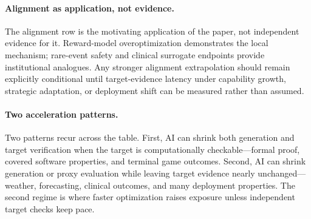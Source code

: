 \paragraph{Alignment as application, not evidence.}
The alignment row is the motivating application of the paper, not independent evidence for it. Reward-model overoptimization demonstrates the local mechanism; rare-event safety and clinical surrogate endpoints provide institutional analogues. Any stronger alignment extrapolation should remain explicitly conditional until target-evidence latency under capability growth, strategic adaptation, or deployment shift can be measured rather than assumed.

\paragraph{Two acceleration patterns.}
Two patterns recur across the table. First, AI can shrink both generation and target verification when the target is computationally checkable---formal proof, covered software properties, and terminal game outcomes. Second, AI can shrink generation or proxy evaluation while leaving target evidence nearly unchanged---weather, forecasting, clinical outcomes, and many deployment properties. The second regime is where faster optimization raises exposure unless independent target checks keep pace.
